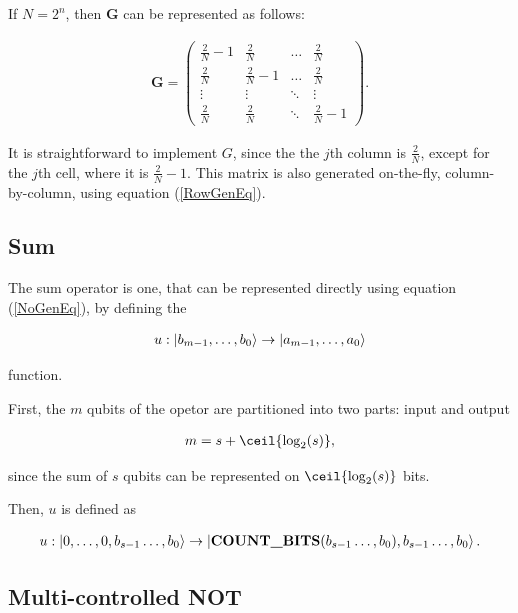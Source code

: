 If $N = 2^n$, then $\mathbf{G}$ can be represented as follows:

\begin{align*}
  \mathbf{G} = \begin{pmatrix}
      \frac{2}{N} - 1 & \frac{2}{N} & \dots  & \frac{2}{N} \\
      \frac{2}{N} & \frac{2}{N} - 1 & \dots  & \frac{2}{N} \\
      \vdots & \vdots & \ddots & \vdots \\
      \frac{2}{N} & \frac{2}{N} & \ddots & \frac{2}{N} - 1
    \end{pmatrix}.
\end{align*}

It is straightforward to implement $G$, since the the $j$th column is $\frac{2}{N}$, except for the $j$th cell, where it is $\frac{2}{N}-1$. This matrix is also generated on-the-fly, column-by-column, using equation (\ref{RowGenEq}).

\subsection{Sum}

The sum operator is one, that can be represented directly using equation (\ref{NoGenEq}), by defining the

\begin{align*}
    u: \ket{b_{m-1},\dots{},b_0} \rightarrow \ket{a_{m-1},\dots{},a_0}
\end{align*}

function.

First, the $m$ qubits of the opetor are partitioned into two parts: input and output

\begin{align*}
m = s + \ceil{\log_{2}(s)},
\end{align*}

since the sum of $s$ qubits can be represented on $\ceil{\log_{2}(s)}$ bits.

Then, $u$ is defined as 

\begin{align*}
    u: \ket{0,\dots{},0,b_{s-1}\dots{},b_0} \rightarrow \ket{\text{\textbf{COUNT\_BITS}}(b_{s-1}\dots{},b_0),b_{s-1}\dots{},b_0}.
\end{align*}

\subsection{Multi-controlled NOT}


